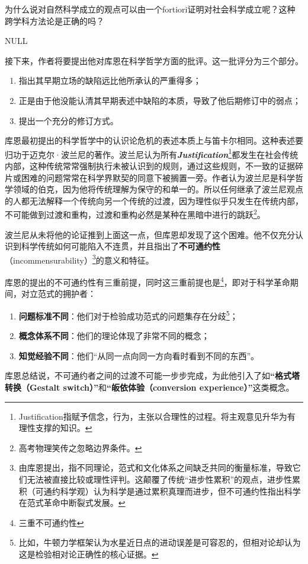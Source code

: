 \documentclass[12pt, a4paper, oneside]{ctexart}
\renewcommand{\b}{\textbf}
\newcommand{\f}{\footnote}
\newcommand{\q}[1]{\begin{questionbox}{}#1\end{questionbox}}
\newcommand{\ans}[1]{\begin{ansbox}{}#1\end{ansbox}}
\newcounter{question}[section]
\newcounter{ans}[section]
\begin{document}
\q{为什么说对自然科学成立的观点可以由一个fortiori证明对社会科学成立呢？这种跨学科方法论是正确的吗？}
\ans{NULL}

接下来，作者将要提出他对库恩在科学哲学方面的批评。这一批评分为三个部分。
\begin{enumerate}
    \item 指出其早期立场的缺陷远比他所承认的严重得多；
    \item 正是由于他没能认清其早期表述中缺陷的本质，导致了他后期修订中的弱点；
    \item 提出一个充分的修订方式。
\end{enumerate}

库恩最初提出的科学哲学中的认识论危机的表述本质上与笛卡尔相同。这种表述要归功于迈克尔·波兰尼的著作。波兰尼认为所有\textit{\b{Justification}}\f{Justification指赋予信念，行为，主张以合理性的过程。将主观意见升华为有理性支撑的知识。}都发生在社会传统内部，这种传统常常强制执行未被认识到的规则，通过这些规则，不一致的证据碎片或困难的问题常常在科学界默契的同意下被搁置一旁。作者认为波兰尼是科学哲学领域的伯克，因为他将传统理解为保守的和单一的。所以任何继承了波兰尼观点的人都无法解释一个传统向另一个传统的过渡，因为理性似乎只发生在传统内部，不可能做到过渡和重构，过渡和重构必然是某种在黑暗中进行的跳跃\f{高考物理笑传之忽略边界条件。}。

波兰尼从未将他的论证推到上面这一点，但库恩却发现了这个困难。他不仅充分认识到科学传统如何可能陷入不连贯，并且指出了\b{不可通约性}（incommensurability）\f{由库恩提出，指不同理论，范式和文化体系之间缺乏共同的衡量标准，导致它们无法被直接比较或理性评判。这颠覆了传统“进步性累积”的观点，进步性累积（可通约科学观）认为科学是通过累积真理而进步，但不可通约性指出科学在范式革命中断裂式发展。}的意义和特征。

库恩的提出的不可通约性有三重前提，同时这三重前提也是\f{三重不可通约性}，即对于科学革命期间，对立范式的拥护者：
\begin{enumerate}
    \item \b{问题标准不同}：他们对于检验成功范式的问题集存在分歧\f{比如，牛顿力学框架认为水星近日点的进动误差是可容忍的，但相对论却认为这是检验相对论正确性的核心证据。}；
    \item \b{概念体系不同}：他们的理论体现了非常不同的概念；
    \item \b{知觉经验不同}：他们“从同一点向同一方向看时看到不同的东西”。
\end{enumerate}
库恩总结说，不可通约者之间的过渡不可能一步步完成，为此他引入了如\b{“格式塔转换（Gestalt switch）”}和\b{“皈依体验（conversion experience）”}这类概念。
\end{document}

